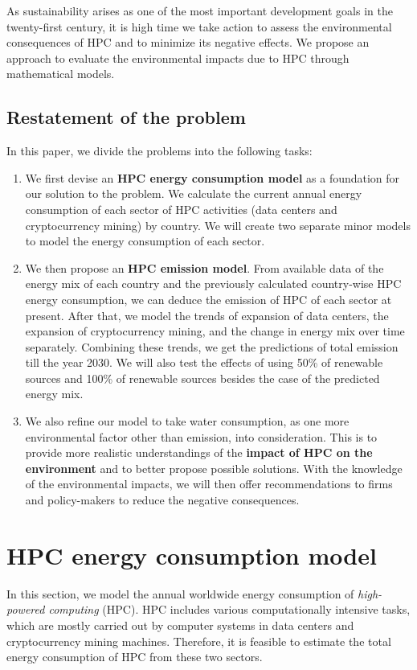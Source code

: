 \documentclass[12pt]{article}
\begin{document}
As sustainability arises as one of the most important development goals in the twenty-first century, it is high time we take action to assess the environmental consequences of HPC and to minimize its negative effects. We propose an approach to evaluate the environmental impacts due to HPC through mathematical models.

\subsection{Restatement of the problem}

In this paper, we divide the problems into the following tasks:
\begin{enumerate}
	\item We first devise an \textbf{HPC energy consumption model} as a foundation for our solution to the problem. We calculate the current annual energy consumption of each sector of HPC activities (data centers and cryptocurrency mining) by country. We will create two separate minor models to model the energy consumption of each sector.
	\item We then propose an \textbf{HPC  emission model}. From available data of the energy mix of each country and the previously calculated country-wise HPC energy consumption, we can deduce the  emission of HPC of each sector at present. After that, we model the trends of expansion of data centers, the expansion of cryptocurrency mining, and the change in energy mix over time separately. Combining these trends, we get the predictions of total  emission till the year 2030. We will also test the effects of using 50\% of renewable sources and 100\% of renewable sources besides the case of the predicted energy mix.
	\item We also refine our model to take water consumption, as one more environmental factor other than  emission, into consideration. This is to provide more realistic understandings of the \textbf{impact of HPC on the environment} and to better propose possible solutions. With the knowledge of the environmental impacts, we will then offer recommendations to firms and policy-makers to reduce the negative consequences.
\end{enumerate}

\section{HPC energy consumption model}

In this section, we model the annual worldwide energy consumption of \textit{high-powered computing} (HPC). HPC includes various computationally intensive tasks, which are mostly carried out by computer systems in data centers and cryptocurrency mining machines. Therefore, it is feasible to estimate the total energy consumption of HPC from these two sectors.
\end{document}
